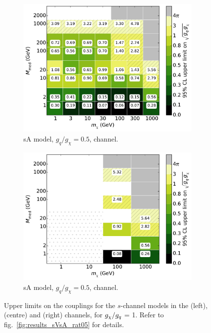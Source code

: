 \begin{figure}
\begin{subfigure}[t]{0.32\textwidth}
    \includegraphics[width=1.\textwidth]{figures/grid_allpoints_SAD_rat1.pdf}
    \caption{sA model, $g_q/g_{\chi} = 0.5$, \monoZ channel.}
  \end{subfigure}
  \begin{subfigure}[t]{0.32\textwidth}
    \centering
    \includegraphics[width=1.\textwidth]{figures/grid_basepoints_SAD_rat1_monoWZ.pdf}
    \caption{sA model, $g_q/g_{\chi} = 0.5$, \monoWZ channel.}
  \end{subfigure}
  \caption{Upper limits on the couplings for the $s$-channel models in the \monojet (left), \monoZ (centre) and \monoWZ (right) channels, for $g_{\chi} / g_q$ = 1. Refer to fig.~\ref{fig:results_sVsA_rat05} for details.}
  \label{fig:results_sVsA_rat1}
\end{figure}


